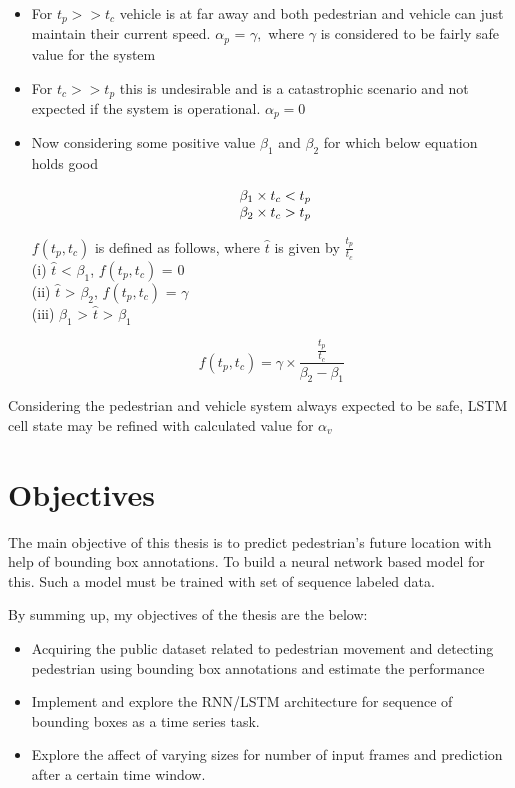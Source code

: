 \begin{itemize}
\item 
For ${t_p}>>{t_c}$ vehicle is at far away and both pedestrian and vehicle can just maintain their current speed. $\alpha_p$ = $\gamma,$ where $\gamma$ is considered to be fairly safe value for the system

\item 
For ${t_c}>>{t_p}$ this is undesirable and is a catastrophic scenario and not expected if the system is operational. $\alpha_p = 0$

\item
Now considering some positive value $\beta_1$ and $\beta_2$ for which below equation holds good

\begin{equation}
\begin{array}{l@{}}
	\beta_1 \times {t_c} < {t_p} \\
	\beta_2 \times {t_c} > {t_p}
\end{array}
\end{equation}

$f(t_p, t_c)$ is defined as follows, where $\hat{t}$ is given by $\frac{t_p}{t_c}$\\
(i) $\hat{t}$ < $\beta_1$, $f(t_p, t_c)$ = 0 \\
(ii) $\hat{t}$ > $\beta_2$, $f(t_p, t_c)$ = $\gamma$ \\
(iii) $\beta_1$ > $\hat{t}$ > $\beta_1$

\begin{equation}
	f(t_p, t_c) = \gamma \times \frac{\frac{t_p}{t_c}}{\beta_2 - \beta_1}  
\end{equation}
\end {itemize}

Considering the pedestrian and vehicle system always expected to be safe, LSTM cell state may be refined with calculated value for $\alpha_v$

\section{Objectives}
\newpara The main objective of this thesis is to predict pedestrian's future location with help of bounding box annotations. To build a neural network based model for this. Such a model must be trained with set of sequence labeled data.

By summing up, my objectives of the thesis are the below:
\begin{itemize}
	\item  Acquiring the public dataset related to pedestrian movement and detecting pedestrian using bounding box annotations and estimate the performance

	\item Implement and explore the RNN/LSTM architecture for sequence of bounding boxes as a time series task.
	\item Explore the affect of varying sizes for number of input frames and prediction after a certain time window.
\end{itemize}

